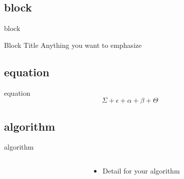 \documentclass{beamer}
\begin{document}
\subsection{block}
\begin{frame}{block}
  \begin{block}{Block Title}
    Anything you want to emphasize
  \end{block}
\end{frame}

\subsection{equation}
\begin{frame}{equation}
  \begin{equation}
  \Sigma + \epsilon + \alpha + \beta + \Theta
  \end{equation}
\end{frame}

\subsection{algorithm}
\begin{frame}{algorithm}
  \begin{columns}
    \begin{column}{0.5\textwidth}
      \begin{algorithm}[H]
        \LinesNumbered
        \caption{\tiny{Algorithm Title}}
        \label{alg:A}
        \tiny
      \end{algorithm}
    \end{column}

    \begin{column}{0.5\textwidth}
      \begin{itemize}
        \item Detail for your algorithm
      \end{itemize}
    \end{column}
  \end{columns}
\end{frame}
\end{document}
